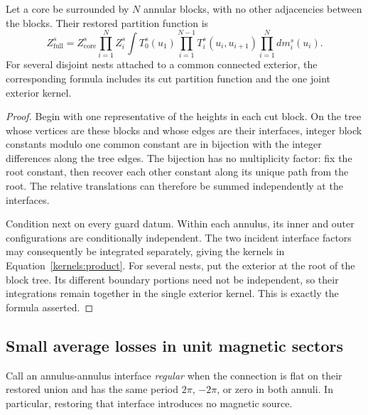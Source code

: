 \begin{lemma}\label{kernels:multiplication}
Let a core be surrounded by \(N\) annular blocks, with no other
adjacencies between the blocks. Their restored partition function is
\begin{equation}\label{kernels:product}
 Z_{\mathrm{full}}^s
 = Z_{\mathrm{core}}^s\prod_{i=1}^N Z_i^s
   \int T_0^s(u_1)
         \prod_{i=1}^{N-1}T_i^s(u_i,u_{i+1})
         \prod_{i=1}^N dm_i^s(u_i).
\end{equation}
For several disjoint nests attached to a common connected exterior,
the corresponding formula includes its cut partition function and
the one joint exterior kernel.
\end{lemma}

\begin{proof}
Begin with one representative of the heights in each cut block.
On the tree whose vertices are these blocks and whose edges are
their interfaces, integer block constants modulo one common
constant are in bijection with the integer differences along the
tree edges. The bijection has no multiplicity factor: fix the
root constant, then recover each other constant along its unique
path from the root. The relative translations can therefore be
summed independently at the interfaces.

Condition next on every guard datum. Within each annulus, its inner
and outer configurations are conditionally independent. The two
incident interface factors may consequently be integrated separately,
giving the kernels in Equation~\eqref{kernels:product}. For several
nests, put the exterior at the root of the block tree. Its different
boundary portions need not be independent, so their integrations
remain together in the single exterior kernel. This is exactly the
formula asserted.
\end{proof}

\subsection{Small average losses in unit magnetic sectors}

Call an annulus-annulus interface \emph{regular} when the connection
is flat on their restored union and has the same period \(2\pi\),
\(-2\pi\), or zero in both annuli. In particular, restoring that
interface introduces no magnetic source.

